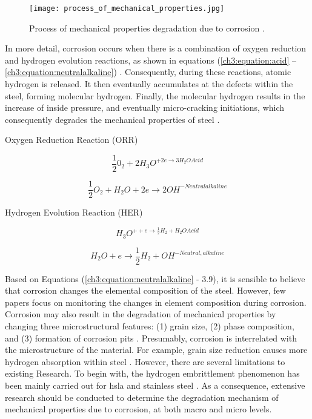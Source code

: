 \begin{figure}[H]
    \centering
    \texttt{[image: process\_of\_mechanical\_properties.jpg]}
    \caption{Process of mechanical properties degradation due to corrosion \cite{protopopoff2011surface}.}
    \label{ch3:figure:degradation}
\end{figure}

In more detail, corrosion occurs when there is a combination of oxygen reduction and hydrogen evolution reactions, as shown in equations (\ref{ch3:equation:acid} – \ref{ch3:equation:neutralalkaline}) \cite{li2018effect}.  Consequently, during these reactions, atomic hydrogen is released. It then eventually accumulates at the defects within the steel, forming molecular hydrogen. Finally, the molecular hydrogen results in the increase of inside pressure, and eventually micro-cracking initiations, which consequently degrades the mechanical properties of steel \cite{whitman1924effect}.

Oxygen Reduction Reaction (ORR)

\begin{equation}
    \frac{1}{2}0_2 + 2H_3O^{+2e \rightarrow 3H_2OAcid}
    \label{ch3:equation:acid}
\end{equation}

\begin{equation}
    \frac{1}{2}O_2 + H_2O + 2e \rightarrow 2OH^{-Neutralalkaline}
\end{equation}

Hydrogen Evolution Reaction (HER)

\begin{equation}
    H_3O^{++e \rightarrow \frac{1}{2}H_2 + H_2OAcid}
\end{equation}

\begin{equation}
    H_2O + e \rightarrow \frac{1}{2}H_2 + OH^{-Neutral,alkaline}
    \label{ch3:equation:neutralalkaline}
\end{equation}

Based on Equations (\ref{ch3:equation:neutralalkaline} - 3.9), it is sensible to believe that corrosion changes the elemental composition of the steel. However, few papers focus on monitoring the changes in element composition during corrosion. Corrosion may also result in the degradation of mechanical properties by changing three microstructural features: (1) grain size, (2) phase composition, and (3) formation of corrosion pits \cite{li2018effect}. Presumably, corrosion is interrelated with the microstructure of the material. For example, grain size reduction causes more hydrogen absorption within steel \cite{li2018effect}. However, there are several limitations to existing Research. To begin with, the hydrogen embrittlement phenomenon has been mainly carried out for \acrfull{hsla} and stainless steel \cite{li2018effect}. As a consequence, extensive research should be conducted to determine the degradation mechanism of mechanical properties due to corrosion, at both macro and micro levels.

